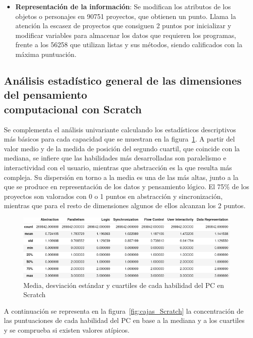\documentclass[a4paper, 12pt]{book}
\begin{document}
\begin{itemize}
    \item \textbf{Representación de la información}: Se modifican los atributos de los objetos o personajes en 90751 proyectos, que obtienen un punto. Llama la atención la escasez de proyectos que consiguen 2 puntos por inicializar y modificar variables para almacenar los datos que requieren los programas, frente a los 56258 que utilizan listas y sus métodos, siendo calificados con la máxima puntuación.     
\end{itemize}

\subsection{Análisis estadístico general de las dimensiones del pensamiento \\computacional con Scratch}
\label{subsec:estad_pc_Scratch}

Se complementa el análisis univariante calculando los estadísticos descriptivos más básicos para cada capacidad que se muestran en la figura~\ref{fig:describe_Scratch}. A partir del valor medio y de la medida de posición del segundo cuartil, que coincide con la mediana, se infiere que las habilidades más desarrolladas son paralelismo e interactividad con el usuario, mientras que abstracción es la que resulta más compleja. Su dispersión en torno a la media es una de las más altas, junto a la que se produce en representación de los datos y pensamiento lógico. El 75\% de los proyectos son valorados con 0 o 1 puntos en abstracción y sincronización, mientras que para el resto de dimensiones algunos de ellos alcanzan los 2 puntos. 

\begin{figure}[H]
    \centering
    \includegraphics[width=1\textwidth]{img/describe_Scratch.png}
    \caption{Media, desviación estándar y cuartiles de cada habilidad del PC en Scratch}
    \label{fig:describe_Scratch}
\end{figure}

A continuación se representa en la figura~\ref{fig:cajas_Scratch} la concentración de las puntuaciones de cada habilidad del PC en base a la mediana y a los cuartiles y se comprueba si existen valores atípicos.
\end{document}
